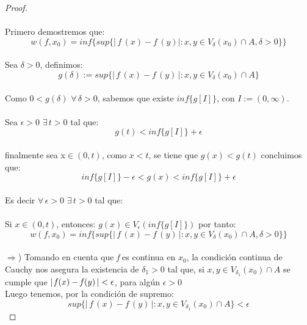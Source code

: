 \documentclass[11pt,letterpaper]{article}
\begin{document}
\begin{proof}\,\\
    \,\\
   Primero demostremos que:\\
\begin{equation*}
    w(f,x_0)= inf \{ sup \{ |\,\textit{f}\,(x)- \textit{f}\,(y)| :x,y \in V_\delta (x_0)\cap A, \delta>0\}\}
\end{equation*}\\
Sea $\delta>0$, definimos:\\
\begin{equation*}
    g(\delta):=sup \{ |\,\textit{f}\,(x)- \textit{f}\,(y)\,| :x,y \in V_\delta (x_0)\cap A \}
 \end{equation*}\\
Como $0<g(\delta)$ $\forall\, \delta>0$, sabemos que existe $inf\{g[I]\}$, con $I:=(0,\infty)$.\\
\,\\
Sea $\epsilon>0$ $\exists\,t>0$ tal que:\\
\begin{equation*}
    g(t)<inf\{g[I]\}+\epsilon
\end{equation*}\\
finalmente sea x$\in (0,t)$, como $x<t$, se tiene que  $g(x)<g(t)$
concluimos que:\\
\begin{equation*}
    inf\{g[I]\}-\epsilon<g(x)<inf\{g[I]\}+\epsilon
\end{equation*}\\
Es decir $\forall\,\epsilon>0$ $\exists\,t>0$ tal que:\\
\,\\
Si $x\in(0,t)$, entonces: $g(x)\in V_\epsilon(inf\{g[I]\})$
por tanto: \\
\begin{equation*}
    w(f,x_0)= inf \{ sup \{ |\,\textit{f}\,(x)- \textit{f}\,(y)\,| :x,y \in V_\delta (x_0)\cap A, \delta>0\}\}
\end{equation*}\\
$\Longrightarrow$) Tomando en cuenta que \textit{f} es continua en $x_0$, la condici\'on continua de Cauchy nos asegura la existencia de $\delta_1 > 0$ tal que, si $x,y\in V_{\delta_1} (x_0)\cap A$ se cumple que $|\,\textit{f}\,(x) - \textit{f\,}(y)\,|<\epsilon$, para alg\'un $\epsilon >0$\\ 
Luego tenemos, por la condici\'on de supremo:\\
\begin{equation*}
 sup \{ |\,\textit{f}\,(x)- \textit{f}\,(y)\,| :x,y \in V_{\delta_1} (x_0)\cap A\}< \epsilon 

\end{equation*}
\end{proof}
\end{document}
